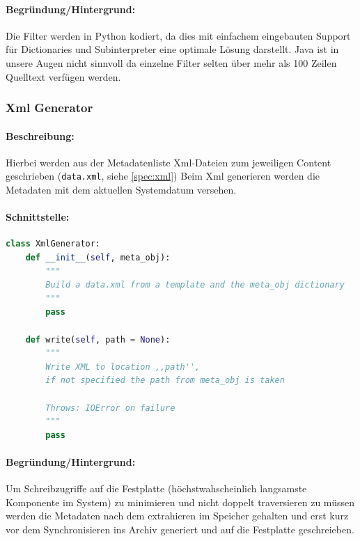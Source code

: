 \paragraph{Begründung/Hintergrund:}
\label{par:begr_ndung_}
Die Filter werden in Python kodiert, da dies mit einfachem eingebauten Support für
Dictionaries und Subinterpreter eine optimale Lösung darstellt.
Java ist in unsere Augen nicht sinnvoll da einzelne Filter
selten über mehr als 100 Zeilen Quelltext verfügen werden.


\subsubsection{Xml Generator}
\label{ssub:xmlgen}
\paragraph{Beschreibung:}
\label{par:beschreibung_}
Hierbei werden aus der Metadatenliste Xml-Dateien zum jeweiligen Content
geschrieben (\texttt{data.xml}, siehe \ref{spec:xml}) 
Beim Xml generieren werden die Metadaten mit dem aktuellen Systemdatum versehen.
\paragraph{Schnittstelle:}
\label{par:schnittstelle_}
\hfill

\begin{lstlisting}[language=python]
class XmlGenerator:
    def __init__(self, meta_obj):
        """
        Build a data.xml from a template and the meta_obj dictionary
        """
        pass

    def write(self, path = None):
        """
        Write XML to location ,,path'', 
        if not specified the path from meta_obj is taken

        Throws: IOError on failure
        """
        pass
\end{lstlisting}
\paragraph{Begründung/Hintergrund:}
\label{par:begr_ndung_hintergrund_}
Um Schreibzugriffe auf die Festplatte (höchstwahscheinlich langsamste Komponente im System) zu minimieren
und nicht doppelt traversieren zu müssen werden die Metadaten nach dem extrahieren im Speicher gehalten und
erst kurz vor dem Synchronisieren ins Archiv generiert und auf die Festplatte geschreieben. 


